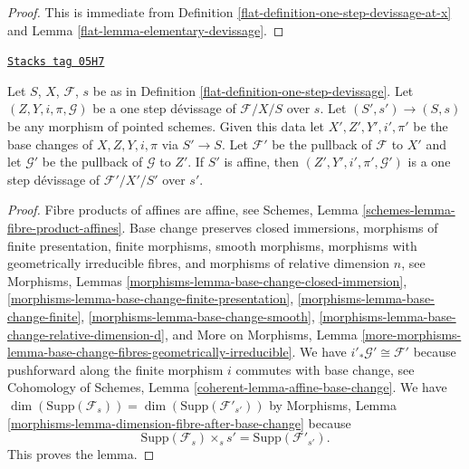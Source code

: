 \begin{proof}

This is immediate from
Definition \ref{flat-definition-one-step-devissage-at-x}
and
Lemma \ref{flat-lemma-elementary-devissage}.
\end{proof}

\begin{lemma}
\label{flat-lemma-base-change-one-step}
\href{https://stacks.math.columbia.edu/tag/05H7}{\texttt{Stacks tag 05H7}}

Let $S$, $X$, $\mathcal{F}$, $s$ be as in
Definition \ref{flat-definition-one-step-devissage}.
Let $(Z, Y, i, \pi, \mathcal{G})$ be a one step d\'evissage
of $\mathcal{F}/X/S$ over $s$.
Let $(S', s') \to (S, s)$ be any morphism of pointed schemes.
Given this data let $X', Z', Y', i', \pi'$ be the base
changes of $X, Z, Y, i, \pi$ via $S' \to S$.
Let $\mathcal{F}'$ be the pullback of $\mathcal{F}$ to $X'$
and let $\mathcal{G}'$ be the pullback of $\mathcal{G}$ to $Z'$.
If $S'$ is affine, then $(Z', Y', i', \pi', \mathcal{G}')$
is a one step d\'evissage of $\mathcal{F}'/X'/S'$ over $s'$.
\end{lemma}

\begin{proof}
Fibre products of affines are affine, see
Schemes, Lemma \ref{schemes-lemma-fibre-product-affines}.
Base change preserves
closed immersions,
morphisms of finite presentation,
finite morphisms,
smooth morphisms,
morphisms with geometrically irreducible fibres, and
morphisms of relative dimension $n$, see
Morphisms, Lemmas \ref{morphisms-lemma-base-change-closed-immersion},
\ref{morphisms-lemma-base-change-finite-presentation},
\ref{morphisms-lemma-base-change-finite},
\ref{morphisms-lemma-base-change-smooth},
\ref{morphisms-lemma-base-change-relative-dimension-d}, and
More on Morphisms, Lemma
\ref{more-morphisms-lemma-base-change-fibres-geometrically-irreducible}.
We have $i'_*\mathcal{G}' \cong \mathcal{F}'$ because pushforward
along the finite morphism $i$ commutes with base change, see
Cohomology of Schemes, Lemma \ref{coherent-lemma-affine-base-change}.
We have
$\dim(\text{Supp}(\mathcal{F}_s)) = \dim(\text{Supp}(\mathcal{F}'_{s'}))$
by
Morphisms, Lemma \ref{morphisms-lemma-dimension-fibre-after-base-change}
because
$$
\text{Supp}(\mathcal{F}_s) \times_s s' = \text{Supp}(\mathcal{F}'_{s'}).
$$
This proves the lemma.
\end{proof}

